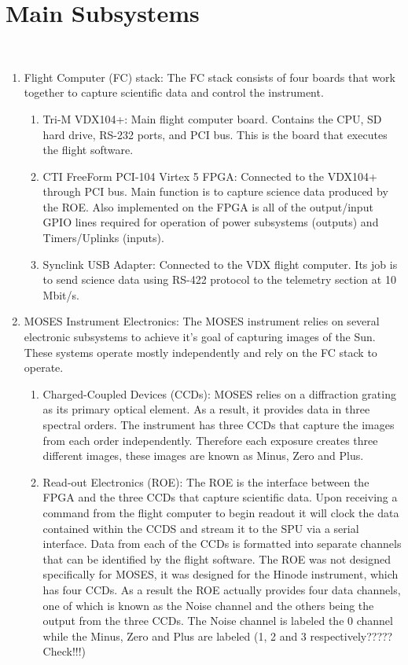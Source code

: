 %
\section{Main Subsystems}
\hrulefill
\\

	\begin{enumerate}
		\item Flight Computer (FC) stack: The FC stack consists of four boards that work together to capture scientific data and control the instrument.
		\begin{enumerate}
			\item Tri-M VDX104+: Main flight computer board. Contains the CPU, SD hard drive, RS-232 ports, and PCI bus. This is the board that executes the flight software.
			\item CTI FreeForm PCI-104 Virtex 5 FPGA: Connected to the VDX104+ through PCI bus. Main function is to capture science data produced by the ROE. Also implemented on the FPGA is all of the output/input GPIO lines required for operation of power subsystems (outputs) and Timers/Uplinks (inputs).
			\item Synclink USB Adapter: Connected to the VDX flight computer. Its job is to send science data using RS-422 protocol to the telemetry section at 10 Mbit/s.
		\end{enumerate}
		\item MOSES Instrument Electronics: The MOSES instrument relies on several electronic subsystems to achieve it's goal of capturing images of the Sun. These systems operate mostly independently and rely on the FC stack to operate.
		\begin{enumerate}
			\item Charged-Coupled Devices (CCDs): MOSES relies on a diffraction grating as its primary optical element. As a result, it provides data in three spectral orders. The instrument has three CCDs that capture the images from each order independently. Therefore each exposure creates three different images, these images are known as Minus, Zero and Plus.
			\item Read-out Electronics (ROE):  The ROE is the interface between the FPGA and the three CCDs that capture scientific data. Upon receiving a command from the flight computer to begin readout it will clock the data contained within the CCDS and stream it to the SPU via a serial interface. Data from each of the CCDs is formatted into separate channels that can be identified by the flight software. The ROE was not designed specifically for MOSES, it was designed for the Hinode instrument, which has four CCDs. As a result the ROE actually provides four data channels, one of which is known as the Noise channel and the others being the output from the three CCDs. The Noise channel is labeled the 0 channel while the Minus, Zero and Plus are labeled (1, 2 and 3 respectively?????Check!!!)

\end{enumerate}
\end{enumerate}
